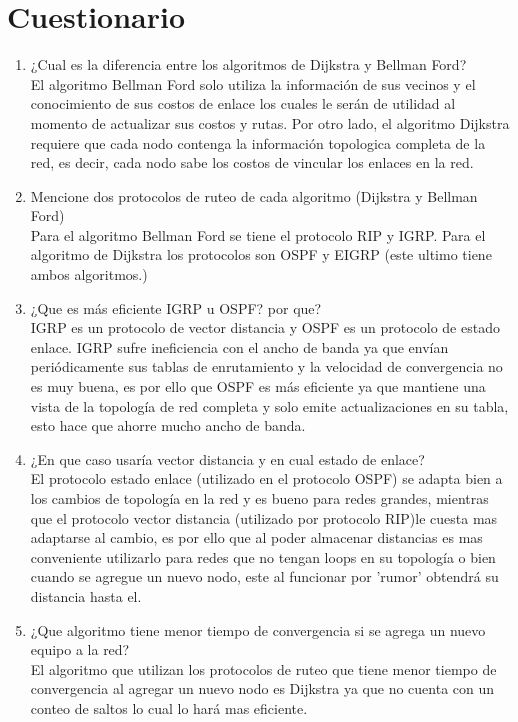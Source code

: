 \documentclass[spanish]{udpreport}
\begin{document}
\chapter{Cuestionario}
\begin{enumerate}
    \item ¿Cual es la diferencia entre los algoritmos de Dijkstra y Bellman Ford?\\
    El algoritmo Bellman Ford solo utiliza la información de sus vecinos y el conocimiento de sus costos de enlace los cuales le serán de utilidad al momento de actualizar sus costos y rutas. Por otro lado, el algoritmo Dijkstra requiere que cada nodo contenga la información topologica completa de la red, es decir, cada nodo sabe los costos de vincular los enlaces en la red.
    \item Mencione dos protocolos de ruteo de cada algoritmo (Dijkstra y Bellman Ford)\\
    Para el algoritmo Bellman Ford se tiene el protocolo RIP y IGRP. Para el algoritmo de Dijkstra los protocolos son OSPF y EIGRP (este ultimo tiene ambos algoritmos.)
    \item ¿Que es más eficiente IGRP u OSPF? por que?\\
    IGRP es un protocolo de vector distancia y OSPF es un protocolo de estado enlace. IGRP sufre ineficiencia con el ancho de banda ya que envían periódicamente sus tablas de enrutamiento y la velocidad de convergencia no es muy buena, es por ello que OSPF es más eficiente ya que mantiene una vista de la topología de red completa y solo emite actualizaciones en su tabla, esto hace que ahorre mucho ancho de banda.
    \item ¿En que caso usaría vector distancia y en cual estado de enlace?\\
    El protocolo estado enlace (utilizado en el protocolo OSPF) se adapta bien a los cambios de topología en la red y es bueno para redes grandes, mientras que el protocolo vector distancia (utilizado por protocolo RIP)le cuesta mas adaptarse al cambio, es por ello que al poder almacenar distancias es mas conveniente utilizarlo para redes que no tengan loops en su topología o bien cuando se agregue un nuevo nodo, este al funcionar por 'rumor' obtendrá su distancia hasta el.
    \item ¿Que algoritmo tiene menor tiempo de convergencia si se agrega un nuevo equipo a la red?\\
    El algoritmo que utilizan los protocolos de ruteo que tiene menor tiempo de convergencia al agregar un nuevo nodo es Dijkstra ya que no cuenta con un conteo de saltos lo cual lo hará mas eficiente.
    
\end{enumerate}
\end{document}
